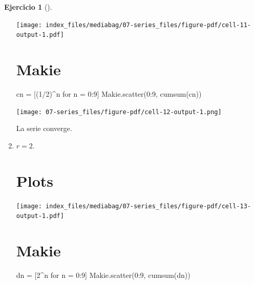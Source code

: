 \documentclass[
  a4paper,
]{scrreport}
\newenvironment{Shaded}{\begin{snugshade}}{\end{snugshade}}
\newcommand{\FloatTok}[1]{\textcolor[rgb]{0.68,0.00,0.00}{#1}}
\newcommand{\FunctionTok}[1]{\textcolor[rgb]{0.28,0.35,0.67}{#1}}
\newcommand{\NormalTok}[1]{\textcolor[rgb]{0.00,0.23,0.31}{#1}}
\newcommand{\OperatorTok}[1]{\textcolor[rgb]{0.37,0.37,0.37}{#1}}
\newcommand{\SpecialCharTok}[1]{\textcolor[rgb]{0.37,0.37,0.37}{#1}}
\newcommand{\StringTok}[1]{\textcolor[rgb]{0.13,0.47,0.30}{#1}}
\theoremstyle{definition}
\newtheorem{exercise}{Ejercicio}[chapter]
\theoremstyle{remark}
\begin{document}
\begin{exercise}[]
\begin{tcolorbox}
\begin{enumerate}
  \texttt{[image: index\_files/mediabag/07-series\_files/figure-pdf/cell-11-output-1.pdf]}

  \section{Makie}

\begin{Shaded}
\begin{Highlighting}[]
\NormalTok{cn }\OperatorTok{=}\NormalTok{ [(}\FloatTok{1}\OperatorTok{/}\FloatTok{2}\NormalTok{)}\OperatorTok{\^{}}\NormalTok{n for n }\OperatorTok{=} \FloatTok{0}\OperatorTok{:}\FloatTok{9}\NormalTok{]}
\NormalTok{Makie.}\FunctionTok{scatter}\NormalTok{(}\FloatTok{0}\OperatorTok{:}\FloatTok{9}\NormalTok{, }\FunctionTok{cumsum}\NormalTok{(cn))}
\end{Highlighting}
\end{Shaded}

  \texttt{[image: 07-series\_files/figure-pdf/cell-12-output-1.png]}

  La serie converge.
\item
  \(r=2\).

  \section{Plots}

\begin{Shaded}
\end{Shaded}

  \texttt{[image: index\_files/mediabag/07-series\_files/figure-pdf/cell-13-output-1.pdf]}

  \section{Makie}

\begin{Shaded}
\begin{Highlighting}[]
\NormalTok{dn }\OperatorTok{=}\NormalTok{ [}\FloatTok{2}\OperatorTok{\^{}}\NormalTok{n for n }\OperatorTok{=} \FloatTok{0}\OperatorTok{:}\FloatTok{9}\NormalTok{]}
\NormalTok{Makie.}\FunctionTok{scatter}\NormalTok{(}\FloatTok{0}\OperatorTok{:}\FloatTok{9}\NormalTok{, }\FunctionTok{cumsum}\NormalTok{(dn))}
\end{Highlighting}
\end{Shaded}


\end{enumerate}
\end{tcolorbox}
\end{exercise}
\end{document}
